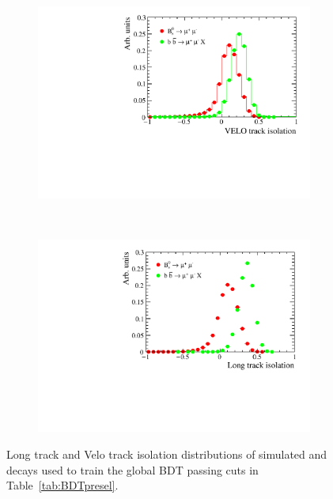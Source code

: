 \begin{figure}
    \centering
    \begin{subfigure}[b]{0.4\textwidth}
        \includegraphics[width=\textwidth]{./Figs/Selection/iso_velo_simulation_all.pdf}
        \caption{ }
        \label{fig:long}
    \end{subfigure}
    ~ %
    \begin{subfigure}[b]{0.4\textwidth}
       \includegraphics[width=\textwidth]{./Figs/Selection/iso_lt_sim_all.pdf}
        \caption{ }
        \label{fig:velo}
    \end{subfigure}
    \caption{Long track and Velo track isolation distributions of simulated \bsmumu and \bbbarmumux decays used to train the global BDT passing cuts in Table~\ref{tab:BDTpresel}.}
    \label{fig:Isolations}
\end{figure}

